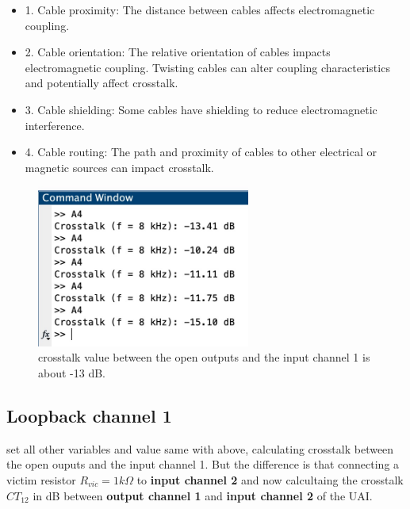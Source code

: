 \documentclass[
	a4paper,
	11pt,
]{article}
\begin{document}
\begin{itemize}
    \item 1. Cable proximity: The distance between cables affects electromagnetic coupling.
    \item 2. Cable orientation: The relative orientation of cables impacts electromagnetic coupling. Twisting cables can alter coupling characteristics and potentially affect crosstalk.
    \item 3. Cable shielding: Some cables have shielding to reduce electromagnetic interference.
    \item 4. Cable routing: The path and proximity of cables to other electrical or magnetic sources can impact crosstalk. 
\end{itemize}

\begin{figure}[htb!]
    \centerline{\includegraphics[width=7cm]{figure/A4/a4_crosstalk_value.jpg}}
    \caption{crosstalk value between the open outputs and the input channel 1 is about -13 dB.}
    \label{fig:A4_crosstalk_value}
\end{figure}

\subsection{Loopback channel 1}
set all other variables and value same with above, calculating crosstalk between the open ouputs and the input channel 1. But the difference is that connecting a victim resistor \(R_{vic} = 1 k \Omega \) to \textbf{input channel 2} and now calcultaing the crosstalk \(CT_12\) in dB between \textbf{output channel 1} and \textbf{input channel 2} of the UAI.
\end{document}
